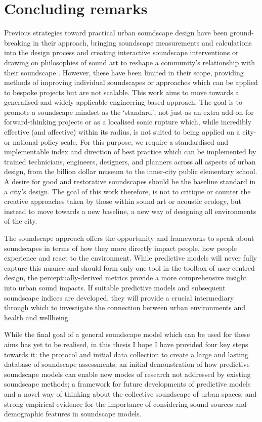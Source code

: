 \section{Concluding remarks}

Previous strategies toward practical urban soundscape design have been ground-breaking in their approach, bringing soundscape measurements and calculations into the design process \citep{SchulteFortkamp2008Using,SchulteFortkamp2016When} and creating interactive soundscape interventions \citep{Steele2021Bringing} or drawing on philosophies of sound art to reshape a community's relationship with their soundscape \citep{Lacey2019Noise}. However, these have been limited in their scope, providing methods of improving individual soundscapes or approaches which can be applied to bespoke projects but are not scalable. This work aims to move towards a generalised and widely applicable engineering-based approach. The goal is to promote a soundscape mindset as the `standard', not just as an extra add-on for forward-thinking projects or as a localised sonic rupture which, while incredibly effective (and affective) within its radius, is not suited to being applied on a city- or national-policy scale. For this purpose, we require a standardised and implementable index and direction of best practice which can be implemented by trained technicians, engineers, designers, and planners across all aspects of urban design, from the billion dollar museum to the inner-city public elementary school. A desire for good and restorative soundscapes should be the baseline standard in a city's design. The goal of this work therefore, is not to critique or counter the creative approaches taken by those within sound art or acoustic ecology, but instead to move towards a new baseline, a new way of designing all environments of the city.

The soundscape approach offers the opportunity and frameworks to speak about soundscapes in terms of how they more directly impact people, how people experience and react to the environment. While predictive models will never fully capture this nuance and should form only one tool in the toolbox of user-centred design, the perceptually-derived metrics provide a more comprehensive insight into urban sound impacts. If suitable predictive models and subsequent soundscape indices are developed, they will provide a crucial intermediary through which to investigate the connection between urban environments and health and wellbeing. 

While the final goal of a general soundscape model which can be used for these aims has yet to be realised, in this thesis I hope I have provided four key steps towards it: the protocol and initial data collection to create a large and lasting database of soundscape assessments; an initial demonstration of how predictive soundscape models can enable new modes of research not addressed by existing soundscape methods; a framework for future developments of predictive models and a novel way of thinking about the collective soundscape of urban spaces; and strong empirical evidence for the importance of considering sound sources and demographic features in soundscape models.